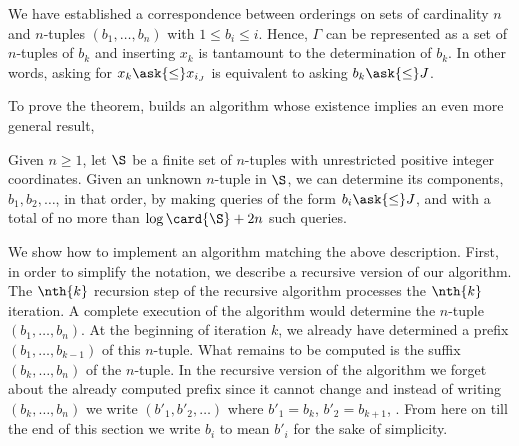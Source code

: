We have established a correspondence between orderings on sets of cardinality
$n$ and $n$-tuples $(b_1, \ldots, b_n)$ with $1 \le b_i \le i$. Hence, $\Gamma$
can be represented as a set of $n$-tuples of $b_k$ and inserting $x_k$ is
tantamount to the determination of $b_k$. In other words, asking for $x_k
\ask{\le} x_{i_J}$ is equivalent to asking $b_k \ask{\le} J$.

To prove the theorem, \citet{fredman:1976} builds an algorithm whose existence
implies an even more general result,

\begin{lemma}
Given $n \ge 1$, let $\S$ be a finite set of $n$-tuples with unrestricted
positive integer coordinates. Given an unknown $n$-tuple in $\S$, we can
determine its components, $b_1, b_2, \ldots$, in that order, by making queries
of the form \(b_i \ask{\le} J\), and with a total of no more than $\log \card{\S}
+ 2n$ such queries.
\end{lemma}

We show how to implement an algorithm matching the above description. First, in
order to simplify the notation, we describe a recursive version of our
algorithm. The $\nth{k}$ recursion step of the recursive algorithm processes
the $\nth{k}$ iteration. A complete execution of the algorithm would determine
the $n$-tuple $(b_1, \ldots, b_n)$.  At the beginning of iteration $k$, we
already have determined a prefix $(b_1, \ldots, b_{k-1})$ of this $n$-tuple.
What remains to be computed is the suffix $(b_k, \ldots, b_n)$ of the
$n$-tuple. In the recursive version of the algorithm we forget about the
already computed prefix since it cannot change and instead of writing $(b_k,
\ldots, b_n)$ we write $(b'_1, b'_2, \ldots)$ where $b'_1 = b_k$, $b'_2 =
b_{k+1}$, \etc. From here on till the end of this section we write $b_i$ to
mean $b'_i$ for the sake of simplicity.

